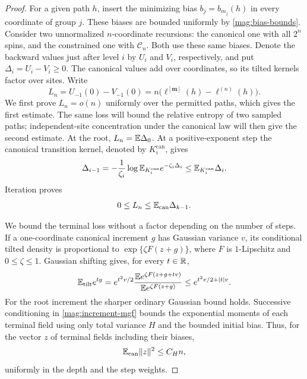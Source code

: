 \begin{proof}
For a given path $h$, insert the minimizing bias $b_j=b_{m_j}(h)$ in
every coordinate of group $j$. These biases are bounded uniformly by
\eqref{mag:bias-bounds}. Consider two unnormalized $n$-coordinate
recursions: the canonical one with all $2^n$ spins, and the constrained
one with $\mathcal C_n$. Both use these same biases. Denote the backward
values just after level $i$ by $U_i$ and $V_i$, respectively, and put
$\Delta_i=U_i-V_i\ge0$. The canonical values add over coordinates, so
its tilted kernels factor over sites. Write
\[
 L_n=U_{-1}(0)-V_{-1}(0)
    =n\bigl(\ell^{[\mathbf m]}(h)-\ell^{(n)}(h)\bigr).
\]
We first prove $L_n=o(n)$ uniformly over the permitted paths, which gives
the first estimate. The same loss will bound the relative entropy of two
sampled paths; independent-site concentration under the canonical law
will then give the second estimate.
At the root, $L_n=\mathbb E\Delta_0$. At a positive-exponent step the canonical
transition kernel, denoted by $K_i^{\mathrm{can}}$, gives
\[
 \Delta_{i-1}
  =-\frac1{\zeta_i}\log
       \mathbb E_{K_i^{\mathrm{can}}}e^{-\zeta_i\Delta_i}
  \le\mathbb E_{K_i^{\mathrm{can}}}\Delta_i.
\]
Iteration proves
\begin{equation}\label{mag:root-leaf-loss}
 0\le L_n\le\mathbb E_{\mathrm{can}}\Delta_{k-1}.
\end{equation}

We bound the terminal loss without a factor depending on the number of
steps. If a one-coordinate canonical increment $g$ has Gaussian variance
$v$, its conditional tilted density is proportional to
$\exp\{\zeta F(z+g)\}$, where $F$ is $1$-Lipschitz and $0\le\zeta\le1$.
Gaussian shifting gives, for every $t\in\mathbb R$,
\begin{equation}\label{mag:increment-mgf}
 \mathbb E_{\mathrm{tilt}}e^{tg}
  =e^{t^2v/2}
    \frac{\mathbb E e^{\zeta F(z+g+tv)}}{\mathbb E e^{\zeta F(z+g)}}
  \le e^{t^2v/2+|t|v}.
\end{equation}
For the root increment the sharper ordinary Gaussian bound holds.
Successive conditioning in \eqref{mag:increment-mgf} bounds the
exponential moments of each terminal field using only total variance
$H$ and the bounded initial bias. Thus, for the vector $z$ of terminal
fields including their biases,
\begin{equation}\label{mag:field-moment}
 \mathbb E_{\mathrm{can}}\|z\|^2\le C_H n,
\end{equation}
uniformly in the depth and the step weights.


\end{proof}
